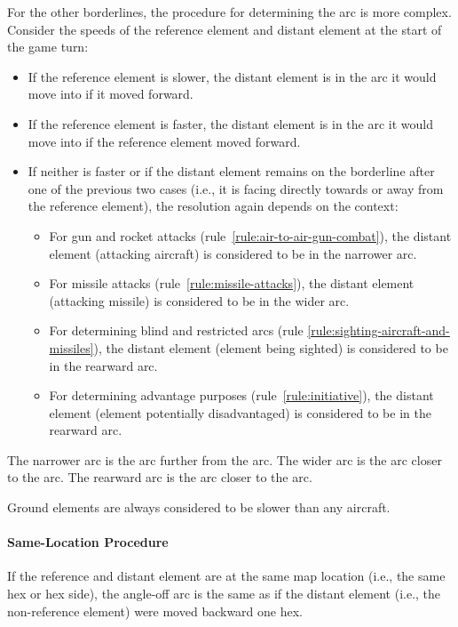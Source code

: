 {For the other borderlines, the procedure for determining the arc is more complex. Consider the speeds of the reference element and distant element at the start of the game turn:
\begin{itemize}
\item If the reference element is slower, the distant element is in the arc it would move into if it moved forward.
\item If the reference element is faster, the distant element is in the arc it would move into if the reference element moved forward.
\item If neither is faster or if the distant element remains on the borderline after one of the previous two cases (i.e., it is facing directly towards or away from the reference element), the resolution again depends on the context:
\begin{itemize}
\item For gun and rocket attacks (rule~\ref{rule:air-to-air-gun-combat}), the distant element (attacking aircraft) is considered to be in the narrower arc.
\item For missile attacks (rule~\ref{rule:missile-attacks}), the distant element (attacking missile) is considered to be in the wider arc.
\item For determining blind and restricted arcs (rule \ref{rule:sighting-aircraft-and-missiles}), the distant element (element being sighted) is considered to be in the rearward arc.
\item For determining advantage purposes (rule~\ref{rule:initiative}), the distant element (element potentially disadvantaged) is considered to be in the rearward arc.
\end{itemize}
\end{itemize}

The narrower arc is the arc further from the  arc. The wider arc is the arc closer to the  arc. The rearward arc is the arc closer to the  arc.

Ground elements are always considered to be slower than any aircraft.

\paragraph{Same-Location Procedure}
If the reference and distant element are at the same map location (i.e., the same hex or hex side), the angle-off arc is the same as if the distant element (i.e., the non-reference element) were moved backward one hex.

}
